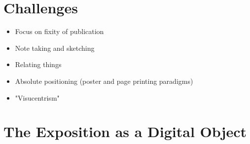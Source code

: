 \documentclass[11pt]{article}
\begin{document}
\section*{Challenges}
\label{sec:org5ebfc76}
\begin{itemize}
\item Focus on fixity of publication
\item Note taking and sketching
\item Relating things
\item Absolute positioning (poster and page printing paradigms)
\item "Visucentrism"
\end{itemize}

\section*{The Exposition as a Digital Object}
\label{sec:org740d1ae}
\end{document}
